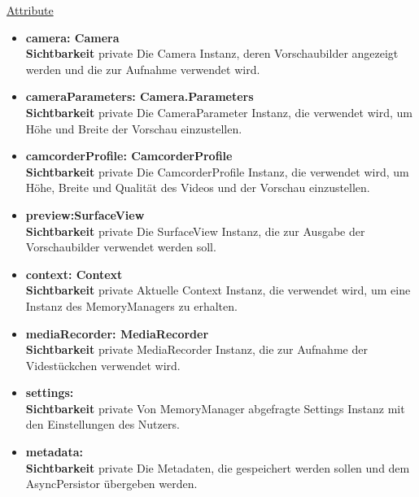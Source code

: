\underline{Attribute}
\begin{itemize}
\itemsep0pt
\item \textbf{camera: Camera} \hfill\\ 
\textbf{Sichtbarkeit} private \newline
Die Camera Instanz, deren Vorschaubilder angezeigt werden und die zur Aufnahme verwendet wird.

\item \textbf{cameraParameters: Camera.Parameters} \hfill\\ 
\textbf{Sichtbarkeit} private \newline
Die CameraParameter Instanz, die verwendet wird, um Höhe und Breite der Vorschau einzustellen.

\item \textbf{camcorderProfile: CamcorderProfile} \hfill\\ 
\textbf{Sichtbarkeit} private \newline
Die CamcorderProfile Instanz, die verwendet wird, um Höhe, Breite und Qualität des Videos  und der Vorschau einzustellen.

\item \textbf{preview:SurfaceView} \hfill\\ 
\textbf{Sichtbarkeit} private \newline
Die SurfaceView Instanz, die zur Ausgabe der Vorschaubilder verwendet werden soll.

\item \textbf{context: Context} \hfill\\ 
\textbf{Sichtbarkeit} private \newline
Aktuelle Context Instanz, die verwendet wird, um eine Instanz des MemoryManagers zu erhalten.

\item \textbf{mediaRecorder: MediaRecorder} \hfill\\ 
\textbf{Sichtbarkeit} private \newline
MediaRecorder Instanz, die zur Aufnahme der Videstückchen verwendet wird.

\item \textbf{settings: } \hfill\\ 
\textbf{Sichtbarkeit} private \newline
Von MemoryManager abgefragte Settings Instanz mit den Einstellungen des Nutzers.

\item \textbf{metadata: } \hfill\\ 
\textbf{Sichtbarkeit} private \newline
Die Metadaten, die gespeichert werden sollen und dem AsyncPersistor übergeben werden.


\end{itemize}
